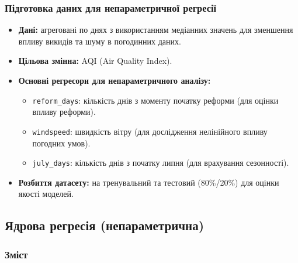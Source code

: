 ﻿\documentclass{beamer}
\begin{document}
\begin{frame}
  \frametitle{Підготовка даних для непараметричної регресії}
  \begin{itemize}
    \item \textbf{Дані:} агреговані по днях з використанням медіанних значень для зменшення впливу викидів та шуму в погодинних даних.
    \item \textbf{Цільова змінна:} AQI (Air Quality Index).
    \item \textbf{Основні регресори для непараметричного аналізу:}
        \begin{itemize}
            \item \texttt{reform\_days}: кількість днів з моменту початку реформи (для оцінки впливу реформи).
            \item \texttt{windspeed}: швидкість вітру (для дослідження нелінійного впливу погодних умов).
            \item \texttt{july\_days}: кількість днів з початку липня (для врахування сезонності).
        \end{itemize}
    \item \textbf{Розбиття датасету:} на тренувальний та тестовий (80\%/20\%) для оцінки якості моделей.
  \end{itemize}
\end{frame}

\begin{frame}
  \section{Ядрова регресія (непараметрична)}

  \frametitle{Зміст}
  \tableofcontents[currentsection]
\end{frame}
\end{document}
